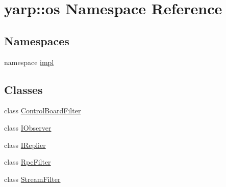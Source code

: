 \hypertarget{namespaceyarp_1_1os}{
\section{yarp::os Namespace Reference}
\label{namespaceyarp_1_1os}
}
\subsection*{Namespaces}
\begin{DoxyCompactItemize}
\item 
namespace \hyperlink{namespaceyarp_1_1os_1_1impl}{impl}
\end{DoxyCompactItemize}
\subsection*{Classes}
\begin{DoxyCompactItemize}
\item 
class \hyperlink{classyarp_1_1os_1_1_control_board_filter}{ControlBoardFilter}
\item 
class \hyperlink{classyarp_1_1os_1_1_i_observer}{IObserver}
\item 
class \hyperlink{classyarp_1_1os_1_1_i_replier}{IReplier}
\item 
class \hyperlink{classyarp_1_1os_1_1_rpc_filter}{RpcFilter}
\item 
class \hyperlink{classyarp_1_1os_1_1_stream_filter}{StreamFilter}
\end{DoxyCompactItemize}
